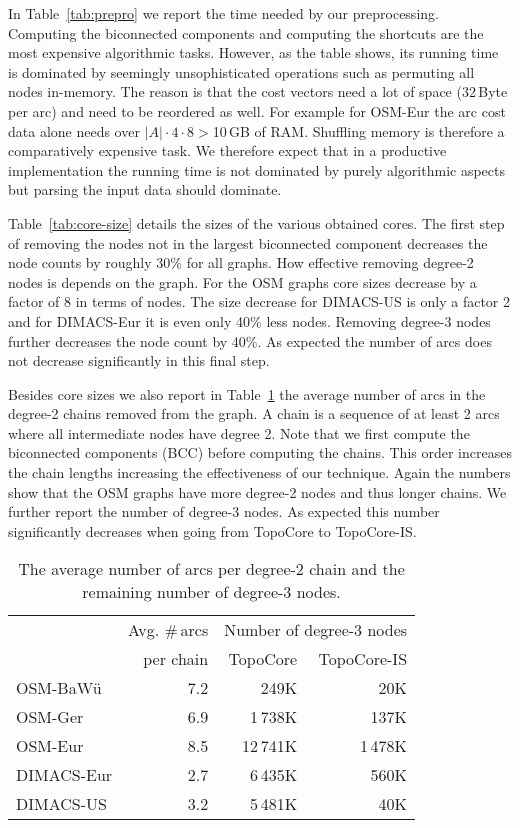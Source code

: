 \documentclass{sig-alternate}
\begin{document}
In Table~\ref{tab:prepro} we report the time needed by our preprocessing.
Computing the biconnected components and computing the shortcuts are
the most expensive algorithmic tasks. However, as the table shows,
its running time is dominated by seemingly unsophisticated operations
such as permuting all nodes in-memory. The reason is that the cost
vectors need a lot of space (32\,Byte per arc) and need to be reordered
as well. For example for OSM-Eur the arc cost data alone needs over
$|A|\cdot4\cdot8>$10\,GB of RAM. Shuffling memory is therefore a comparatively
expensive task. We therefore expect that in a productive implementation
the running time is not dominated by purely algorithmic aspects but parsing the input data should dominate.

Table~\ref{tab:core-size} details the sizes of the various obtained cores.
The first step of removing the nodes not in the largest biconnected
component decreases the node counts by roughly 30\% for all graphs.
How effective removing degree-2 nodes is depends on the graph. For
the OSM graphs core sizes decrease by a factor of 8 in terms of nodes.
The size decrease for DIMACS-US is only a factor 2 and for DIMACS-Eur
it is even only 40\% less nodes. Removing degree-3 nodes further decreases
the node count by 40\%. As expected the number of arcs does not decrease significantly in this final step.

Besides core sizes we also report in Table~\ref{tab:chain} the average
number of arcs in the degree-2 chains removed from the graph. A chain
is a sequence of at least 2 arcs where all intermediate nodes have
degree 2. Note that we first compute the biconnected components (BCC) before computing the
chains. This order increases the chain lengths increasing the effectiveness
of our technique. Again the numbers show that the OSM graphs have
more degree-2 nodes and thus longer chains. We further report the
number of degree-3 nodes. As expected this number significantly decreases
when going from TopoCore to TopoCore-IS.

\begin{table}
\caption{\label{tab:chain}The average number of arcs per degree-2 chain and
the remaining number of degree-3 nodes.}
\begin{centering}
\begin{tabular}{lrrr}
\toprule
 & Avg. \#\,arcs  & \multicolumn{2}{c}{Number of degree-3 nodes}\tabularnewline
 & per chain & TopoCore & TopoCore-IS\tabularnewline
\midrule 
OSM-BaWü & 7.2 & 249K & 20K\tabularnewline
OSM-Ger & 6.9 & 1\,738K & 137K\tabularnewline
OSM-Eur & 8.5 & 12\,741K & 1\,478K\tabularnewline
DIMACS-Eur & 2.7 & 6\,435K & 560K\tabularnewline
DIMACS-US & 3.2 & 5\,481K & 40K\tabularnewline
\bottomrule
\end{tabular}
\par\end{centering}
\end{table}
\end{document}
